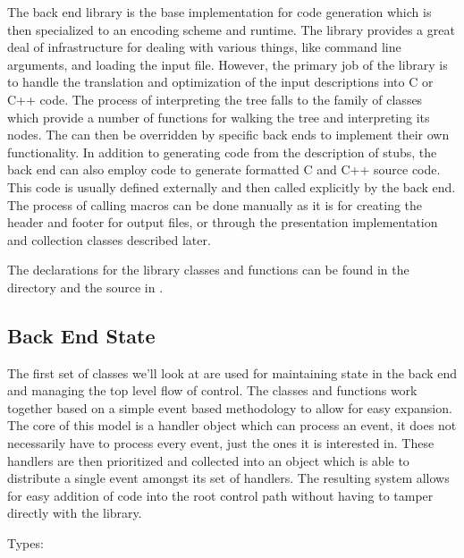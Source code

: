 The back end library is the base implementation for code generation which is
then specialized to an encoding scheme and runtime.  The library provides a
great deal of infrastructure for dealing with various things, like command line
arguments, and loading the \PRESC{} input file.  However, the primary job of
the library is to handle the translation and optimization of the input \PRESC{}
descriptions into C or C++ code.  The process of interpreting the \PRESC{} tree
falls to the  family of classes which provide a number of
functions for walking the tree and interpreting its nodes.  The
 can then be overridden by specific back ends to implement
their own functionality.  In addition to generating code from the \PRESC{}
description of stubs, the back end can also employ \SCML{} code to generate
formatted C and C++ source code.  This \SCML{} code is usually defined
externally and then called explicitly by the back end.  The process of calling
\SCML{} macros can be done manually as it is for creating the header and footer
for output files, or through the presentation implementation and collection
classes described later.

The declarations for the library classes and functions can be found in the
 directory and the source in .

\subsection{Back End State}
\label{subsec:BE:Back End State}

The first set of classes we'll look at are used for maintaining state in the
back end and managing the top level flow of control.  The classes and functions
work together based on a simple event based methodology to allow for easy
expansion.  The core of this model is a handler object which can process an
event, it does not necessarily have to process every event, just the ones it is
interested in.  These handlers are then prioritized and collected into an
object which is able to distribute a single event amongst its set of handlers.
The resulting system allows for easy addition of code into the root control
path without having to tamper directly with the library.

Types:

